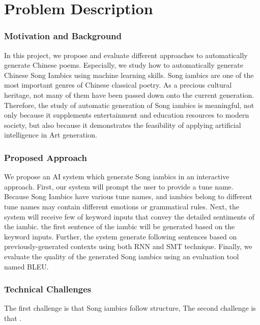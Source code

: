 \section{Problem Description}
\subsubsection{Motivation and Background}
In this project, we propose and evaluate different approaches to automatically generate Chinese poems. 
%
Especially, we study how to automatically generate Chinese Song Iambics using machine learning skills.
%
Song iambics are one of the most important genres of Chinese classical poetry. 
%
As a precious cultural heritage, not many of them have been passed down onto the current generation.
%
Therefore, the study of automatic generation of Song iambics is meaningful, not only because it supplements entertainment and education resources to modern society, but also because it demonstrates the feasibility of applying artificial intelligence in Art generation. 
%
\subsubsection{Proposed Approach}
We propose an AI system which generate Song iambics in an interactive approach.
%
First, our system will prompt the user to provide a tune name.
%
Because Song Iambics have various tune names, and iambics belong to different tune names may contain different emotions or grammatical rules.
%
Next, the system will receive few of keyword inputs that convey the detailed sentiments of the iambic.
%
the first sentence of the iambic will be generated based on the keyword inputs.
%
Further, the system generate following sentences based on previously-generated contexts using both RNN and SMT technique.
%
Finally, we evaluate the quality of the generated Song iambics using an evaluation tool named BLEU.

\subsubsection{Technical Challenges}
The first challenge is that Song iambics follow structure,
The second challenge is that .


 